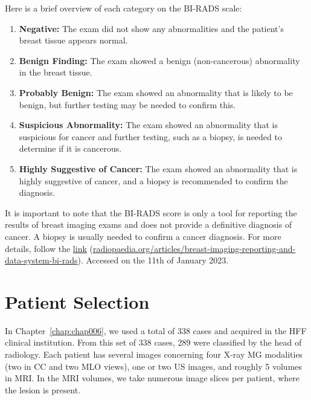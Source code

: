 \vspace{1.5mm}

\noindent
Here is a brief overview of each category on the \ac{BI-RADS} scale:

\vspace{0.5mm}

\begin{enumerate}
\item {\bf Negative:} The exam did not show any abnormalities and the patient's breast tissue appears normal.
\item {\bf Benign Finding:} The exam showed a benign (non-cancerous) abnormality in the breast tissue.
\item {\bf Probably Benign:} The exam showed an abnormality that is likely to be benign, but further testing may be needed to confirm this.
\item {\bf Suspicious Abnormality:} The exam showed an abnormality that is suspicious for cancer and further testing, such as a biopsy, is needed to determine if it is cancerous.
\item {\bf Highly Suggestive of Cancer:} The exam showed an abnormality that is highly suggestive of cancer, and a biopsy is recommended to confirm the diagnosis.
\end{enumerate}

\vspace{0.5mm}

It is important to note that the \ac{BI-RADS} score is only a tool for reporting the results of breast imaging exams and does not provide a definitive diagnosis of cancer.
A biopsy is usually needed to confirm a cancer diagnosis.
For more details, follow the \href{https://radiopaedia.org/articles/breast-imaging-reporting-and-data-system-bi-rads}{link} (\href{https://radiopaedia.org/articles/breast-imaging-reporting-and-data-system-bi-rads}{radiopaedia.org/articles/breast-imaging-reporting-and-data-system-bi-rads}).
Accessed on the 11th of January 2023.

\section{Patient Selection}
\label{sec:app005010}

In Chapter~\ref{chap:chap006}, we used a total of 338 cases and acquired in the \ac{HFF} clinical institution.
From this set of 338 cases, 289 were classified by the head of radiology.
Each patient has several images concerning four X-ray \ac{MG} modalities (two in \ac{CC} and two \ac{MLO} views), one or two US images, and roughly 5 volumes in \ac{MRI}.
In the \ac{MRI} volumes, we take numerous image slices per patient, where the lesion is present.

